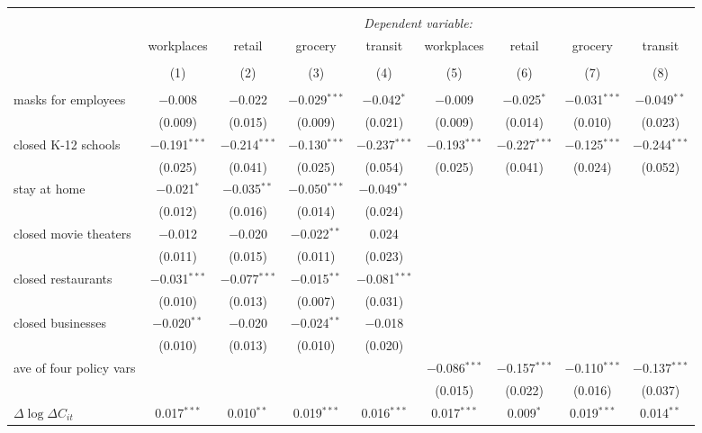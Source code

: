 \begin{tabular}{@{\extracolsep{1pt}}lcccccccc} 
\\[-1.8ex]\hline 
\hline \\[-1.8ex] 
 & \multicolumn{8}{c}{\textit{Dependent variable:}} \\ 
\cline{2-9} 
 & workplaces & retail & grocery & transit & workplaces & retail & grocery & transit \\ 
\\[-1.8ex] & (1) & (2) & (3) & (4) & (5) & (6) & (7) & (8)\\ 
\hline \\[-1.8ex] 
 masks for employees & $-$0.008 & $-$0.022 & $-$0.029$^{***}$ & $-$0.042$^{*}$ & $-$0.009 & $-$0.025$^{*}$ & $-$0.031$^{***}$ & $-$0.049$^{**}$ \\ 
  & (0.009) & (0.015) & (0.009) & (0.021) & (0.009) & (0.014) & (0.010) & (0.023) \\ 
  closed K-12 schools & $-$0.191$^{***}$ & $-$0.214$^{***}$ & $-$0.130$^{***}$ & $-$0.237$^{***}$ & $-$0.193$^{***}$ & $-$0.227$^{***}$ & $-$0.125$^{***}$ & $-$0.244$^{***}$ \\ 
  & (0.025) & (0.041) & (0.025) & (0.054) & (0.025) & (0.041) & (0.024) & (0.052) \\ 
  stay at home & $-$0.021$^{*}$ & $-$0.035$^{**}$ & $-$0.050$^{***}$ & $-$0.049$^{**}$ &  &  &  &  \\ 
  & (0.012) & (0.016) & (0.014) & (0.024) &  &  &  &  \\ 
  closed movie theaters & $-$0.012 & $-$0.020 & $-$0.022$^{**}$ & 0.024 &  &  &  &  \\ 
  & (0.011) & (0.015) & (0.011) & (0.023) &  &  &  &  \\ 
  closed restaurants & $-$0.031$^{***}$ & $-$0.077$^{***}$ & $-$0.015$^{**}$ & $-$0.081$^{***}$ &  &  &  &  \\ 
  & (0.010) & (0.013) & (0.007) & (0.031) &  &  &  &  \\ 
  closed businesses & $-$0.020$^{**}$ & $-$0.020 & $-$0.024$^{**}$ & $-$0.018 &  &  &  &  \\ 
  & (0.010) & (0.013) & (0.010) & (0.020) &  &  &  &  \\ 
  ave of four policy vars &  &  &  &  & $-$0.086$^{***}$ & $-$0.157$^{***}$ & $-$0.110$^{***}$ & $-$0.137$^{***}$ \\ 
  &  &  &  &  & (0.015) & (0.022) & (0.016) & (0.037) \\ 
  $\Delta \log \Delta C_{it}$ & 0.017$^{***}$ & 0.010$^{**}$ & 0.019$^{***}$ & 0.016$^{***}$ & 0.017$^{***}$ & 0.009$^{*}$ & 0.019$^{***}$ & 0.014$^{**}$ \\ 

\end{tabular}
